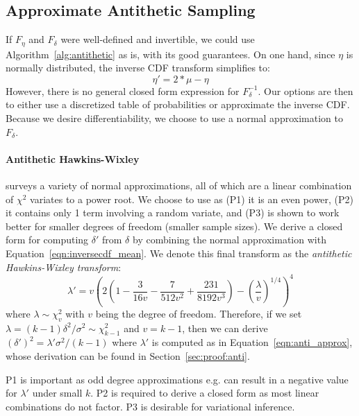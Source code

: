 \subsection{Approximate Antithetic Sampling}

If $F_\eta$ and $F_\delta$ were well-defined and invertible, we could use Algorithm~\ref{alg:antithetic} as is, with its good guarantees. On one hand, since $\eta$ is normally distributed, the inverse CDF transform simplifies to:
\begin{equation}
    \eta' = 2 * \mu - \eta
\label{eqn:inversecdf_mean}
\end{equation}
However, there is no general closed form expression for $F^{-1}_\delta$. Our options are then to either use a discretized table of probabilities or approximate the inverse CDF. Because we desire differentiability, we choose to use a normal approximation to $F_{\delta}$.

\paragraph{Antithetic Hawkins-Wixley}

\cite{canal2005normal} surveys a variety of normal approximations, all of which are a linear combination of $\chi^2$ variates to a power root. We choose to use \cite{hawkins1986note} as (P1) it is an even power, (P2) it contains only 1 term involving a random variate, and (P3) is shown to work better for smaller degrees of freedom (smaller sample sizes). We derive a closed form for computing $\delta'$ from $\delta$ by combining the normal approximation with Equation~\ref{eqn:inversecdf_mean}. We denote this final transform as the \textit{antithetic Hawkins-Wixley transform}:
\begin{equation}
    \lambda' = v(2(1 - \frac{3}{16v} - \frac{7}{512v^2} + \frac{231}{8192v^3}) - (\frac{\lambda}{v})^{1/4})^4
    \label{eqn:anti_approx}
\end{equation}
where $\lambda \sim \chi^2_{v}$ with $v$ being the degree of freedom. Therefore, if we set $\lambda = (k-1)\delta^2/\sigma^2 \sim \chi^2_{k-1}$ and $v = k - 1$, then we can derive $(\delta')^2 = \lambda'\sigma^2/(k-1)$ where $\lambda'$ is computed as in Equation~\ref{eqn:anti_approx}, whose derivation can be found in Section~\ref{sec:proof:anti}.

P1 is important as odd degree approximations e.g. \cite{wilson1931distribution} can result in a negative value for $\lambda'$ under small $k$. P2 is required to derive a closed form as most linear combinations do not factor. P3 is desirable for variational inference.

